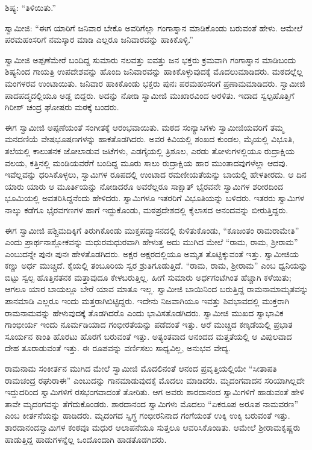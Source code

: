  ಶಿಷ್ಯ: “ತಿಳಿಯಿತು.” 

 ಸ್ವಾಮೀಜಿ: “ಈಗ ಯಾರಿಗೆ ಜನಿವಾರ ಬೇಕೊ ಅವರಿಗೆಲ್ಲಾ ಗಂಗಾಸ್ನಾನ ಮಾಡಿಕೊಂಡು ಬರುವಂತೆ ಹೇಳು. ಆಮೇಲೆ ಪರಮಹಂಸರಿಗೆ ನಮಸ್ಕಾರ ಮಾಡಿ ಎಲ್ಲರೂ ಜನಿವಾರವನ್ನು ಹಾಕಿಕೊಳ್ಳಿ.” 

 ಸ್ವಾಮೀಜಿ ಅಪ್ಪಣೆಮೇರೆ ಬಂದಿದ್ದ ಸುಮಾರು ನಲವತ್ತು ಐವತ್ತು ಜನ ಭಕ್ತರು ಕ್ರಮವಾಗಿ ಗಂಗಾಸ್ನಾನ ಮಾಡಿಬಂದು ಶಿಷ್ಯನಿಂದ ಗಾಯತ್ರಿ ಉಪದೇಶವನ್ನು ಹೊಂದಿ ಜನಿವಾರವನ್ನು ಹಾಕಿಕೊಳ್ಳುವುದಕ್ಕೆ ಮೊದಲುಮಾಡಿದರು. ಮಠದಲ್ಲೆಲ್ಲ ಮಂಗಳರವ ಉಂಟಾಯಿತು. ಜನಿವಾರ ಹಾಕಿಕೊಂಡು ಭಕ್ತರು ಪುನಃ ಪರಮಹಂಸರಿಗೆ ಪ್ರಣಾಮಮಾಡಿದರು. ಸ್ವಾಮೀಜಿ ಪಾದಪದ್ಮದಲ್ಲಿಯೂ ಅಡ್ಡ ಬಿದ್ದರು. ಅದನ್ನು ನೋಡಿ ಸ್ವಾಮೀಜಿ ಮುಖಾರವಿಂದ ಅರಳಿತು. ಇದಾದ ಸ್ವಲ್ಪಹೊತ್ತಿಗೆ ಗಿರೀಶ್ ಚಂದ್ರ ಘೋಷರು ಮಠಕ್ಕೆ ಬಂದರು. 

 ಈಗ ಸ್ವಾಮೀಜಿ ಅಪ್ಪಣೆಯಂತೆ ಸಂಗೀತಕ್ಕೆ ಆರಂಭವಾಯಿತು. ಮಠದ ಸಂನ್ಯಾಸಿಗಳು ಸ್ವಾಮೀಜಿಯವರಿಗೆ ತಮ್ಮ ಮನದಣಿಯೆ ವೇಷಭೂಷಣಗಳನ್ನು ಹಾಕತೊಡಗಿದರು. ಅವರ ಕಿವಿಯಲ್ಲಿ ಶಂಖದ ಕುಂಡಲ, ಮೈಯಲ್ಲಿ ವಿಭೂತಿ, ತಲೆಯಲ್ಲಿ ಕಾಲುತನಕ ಜೋಲಾಡುವ ಜಟೆಗಳು, ಎಡಗೈಯಲ್ಲಿ ತ್ರಿಶೂಲ, ಎರಡು ತೋಳುಗಳಲ್ಲಿಯೂ ರುದ್ರಾಕ್ಷಿಯ ವಲಯ, ಕತ್ತಿನಲ್ಲಿ ಮಂಡಿಯವರೆಗೆ ಬಂದಿದ್ದ ಮೂರು ಸಾಲು ರುದ್ರಾಕ್ಷಿಯ ಹಾರ ಮುಂತಾದವುಗಳೆಲ್ಲಾ ಆದವು. ಇವೆಲ್ಲವನ್ನು ಧರಿಸಿಕೊಳ್ಳಲು, ಸ್ವಾಮಿಗಳ ರೂಪದಲ್ಲಿ ಉಂಟಾದ ರಮಣೀಯತೆಯನ್ನು ಬಾಯಲ್ಲಿ ಹೇಳತೀರದು. ಆ ದಿನ ಯಾರು ಯಾರು ಆ ಮೂರ್ತಿಯನ್ನು ನೋಡಿದರೊ ಅವರೆಲ್ಲರೂ ಸಾಕ್ಷಾತ್ ಭೈರವನೇ‌ ಸ್ವಾಮಿಗಳ ಶರೀರದಿಂದ ಭೂಮಿಯಲ್ಲಿ ಅವತರಿಸಿದ್ದನೆಂದು ಹೇಳಿದರು. ಸ್ವಾಮಿಗಳೂ ಇತರರಿಗೆ ವಿಭೂತಿಯನ್ನು ಬಳಿದರು. ಇತರರು ಸ್ವಾಮಿಗಳ ನಾಲ್ಕು ಕಡೆಗೂ ಭೈರವಗಣಗಳ ಹಾಗೆ ಇದ್ದುಕೊಂಡು, ಮಠಪ್ರದೇಶದಲ್ಲಿ ಕೈಲಾಸದ ಆನಂದವನ್ನು ಬೀರುತ್ತಿದ್ದರು. 

 ಈಗ ಸ್ವಾಮೀಜಿ ಪಶ್ಚಿಮದಿಕ್ಕಿಗೆ ತಿರುಗಿಕೊಂಡು ಮುಕ್ತಪದ್ಮಾಸನದಲ್ಲಿ ಕುಳಿತುಕೊಂಡು, “ಕೂಜಂತಂ ರಾಮರಾಮೇತಿ” ಎಂದು ಪ್ರಾರ್ಥನಾಶ್ಲೋಕವನ್ನು ಮಧುರಮಧುರವಾಗಿ ಹೇಳುತ್ತ ಅದು ಮುಗಿದ ಮೇಲೆ “ರಾಮ, ರಾಮ, ಶ‍್ರೀರಾಮ” ಎಂಬುದನ್ನೇ ಪುನಃ ಪುನಃ ಹೇಳತೊಡಗಿದರು. ಅಕ್ಷರ ಅಕ್ಷರದಲ್ಲಿಯೂ ಅಮೃತ ತೊಟ್ಟಿಕ್ಕುವಂತೆ ಇತ್ತು. ಸ್ವಾಮೀಜಿಯ ಕಣ್ಣು ಅರ್ಧ ಮುಚ್ಚಿದೆ. ಕೈಯಲ್ಲಿ ತಂಬೂರಿಯ ಸ್ವರ ಶ್ರುತಿಗೂಡುತ್ತಿದೆ. “ರಾಮ, ರಾಮ, ಶ‍್ರೀರಾಮ” ಎಂಬ ಧ್ವನಿಯನ್ನು ಬಿಟ್ಟು ಸ್ವಲ್ಪ ಹೊತ್ತಿನತನಕ ಮತ್ತಾವುದೂ ಕೇಳಬರುತ್ತಿಲ್ಲ. ಹೀಗೆ ಸುಮಾರು ಅರ್ಧಗಂಟೆಗಿಂತ ಹೆಚ್ಚಾಗಿ ಕಳೆಯಿತು; ಆಗಲೂ ಯಾರ ಬಾಯಲ್ಲೂ ಬೇರೆ ಯಾವ ಮಾತೂ ಇಲ್ಲ. ಸ್ವಾಮೀಜಿ ಬಾಯಿನಿಂದ ಬರುತ್ತಿದ್ದ ರಾಮನಾಮಾಮೃತವನ್ನು ಪಾನಮಾಡಿ ಎಲ್ಲರೂ ಇಂದು ಮತ್ತರಾಗಿಬಿಟ್ಟಿದ್ದರು. ಇದೇನು ನಿಜವಾಗಿಯೂ ಇವತ್ತು ಶಿವಭಾವದಲ್ಲಿ ಮುಕ್ತರಾಗಿ ರಾಮನಾಮವನ್ನು ಹೇಳುವುದಕ್ಕೆ ತೊಡಗಿದರೊ ಎಂದು ಭಾವಿಸತೊಡಗಿದರು. ಸ್ವಾಮೀಜಿ ಮುಖದ ಸ್ವಾಭಾವಿಕ ಗಾಂಭೀರ್ಯ ಇಂದು ನೂರ್ಮಡಿಯಾದ ಗಂಭೀರತೆಯನ್ನು ಪಡೆದಂತೆ ಇತ್ತು. ಅರೆ ಮುಚ್ಚಿದ ಕಣ್ಕಡೆಯಲ್ಲಿ ಪ್ರಭಾತ ಸೂರ್ಯನ ಕಾಂತಿ ಹೊರಟು ಹೊರಗೆ ಬರುವಂತೆ ಇತ್ತು. ಅತ್ಯಂತವಾದ ಆನಂದದ ಮತ್ತತೆಯಲ್ಲಿ ಆ ವಿಪುಲವಾದ ದೇಹ ತೂರಾಡುವಂತೆ ಇತ್ತು. ಈ ರೂಪವನ್ನು ವರ್ಣಿಸಲು ಸಾಧ್ಯವಿಲ್ಲ, ಅನುಭವ ವೇದ್ಯ. 

 ರಾಮನಾಮ ಸಂಕೀರ್ತನ ಮುಗಿದ ಮೇಲೆ ಸ್ವಾಮೀಜಿ ಮೊದಲಿನಂತೆ ಆನಂದ ಪ್ರವೃತ್ತಿಯಲ್ಲಿಯೇ “ಸೀತಾಪತಿ ರಾಮಚಂದ್ರ ರಘುರಾಈ” ಎಂಬುದನ್ನು ಗಾನಮಾಡುವುದಕ್ಕೆ ಮೊದಲು ಮಾಡಿದರು. ಮೃದಂಗವಾದನ ಸರಿಯಾಗಿಲ್ಲದೇ ಇದ್ದುದರಿಂದ ಸ್ವಾಮಿಗಳಿಗೆ ರಸಭಂಗವಾದಂತೆ ತೋರಿತು. ಆಗ ಅವರು ಶಾರದಾನಂದ ಸ್ವಾಮಿಗಳಿಗೆ ಹಾಡುವಂತೆ ಹೇಳಿ ತಾವೇ ಮೃದಂಗವನ್ನು ತೆಗೆದುಕೊಂಡರು. ಶಾರದಾನಂದ ಸ್ವಾಮಿಗಳು ಮೊದಲು “ಏಕರೂಪ ಅರೂಪ ನಾಮವರಣ” ಎಂಬ ಕೀರ್ತನೆಯನ್ನು ಹಾಡಿದರು. ಮೃದಂಗದ ಸ್ನಿಗ್ಧ ಗಂಭೀರನಿನಾದ ಗಂಗೆಯಂತೆ ಉಕ್ಕಿ ಉಕ್ಕಿ ಬರುವಂತೆ ಇತ್ತು. ಶಾರದಾನಂದಸ್ವಾಮಿಗಳ ಕಂಠವೂ ಮಧುರ ಆಲಾಪನೆಯೂ ಸುತ್ತಲೂ ಆವರಿಸಿಕೊಂಡಿತು. ಆಮೇಲೆ ಶ‍್ರೀರಾಮಕೃಷ್ಣರು ಹಾಡುತ್ತಿದ್ದ ಹಾಡುಗಳನ್ನೆಲ್ಲ ಒಂದೊಂದಾಗಿ ಹಾಡತೊಡಗಿದರು. 


